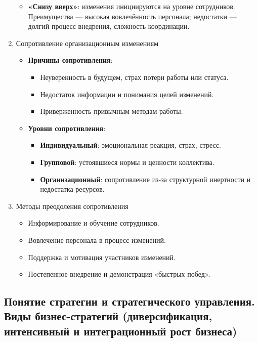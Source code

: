 \begin{enumerate}
\begin{itemize}
            \item \textbf{«Снизу вверх»}: изменения инициируются на уровне сотрудников. Преимущества --- высокая вовлечённость персонала; недостатки --- долгий процесс внедрения, сложность координации.
        \end{itemize}
    \item Сопротивление организационным изменениям
        \begin{itemize}
            \item \textbf{Причины сопротивления}:
            \begin{itemize}
                \item Неуверенность в будущем, страх потери работы или статуса.
                \item Недостаток информации и понимания целей изменений.
                \item Приверженность привычным методам работы.
            \end{itemize}
            \item \textbf{Уровни сопротивления}:
            \begin{itemize}
                \item \textbf{Индивидуальный}: эмоциональная реакция, страх, стресс.
                \item \textbf{Групповой}: устоявшиеся нормы и ценности коллектива.
                \item \textbf{Организационный}: сопротивление из-за структурной инертности и недостатка ресурсов.
            \end{itemize}
        \end{itemize}
    \item Методы преодоления сопротивления
        \begin{itemize}
            \item Информирование и обучение сотрудников.
            \item Вовлечение персонала в процесс изменений.
            \item Поддержка и мотивация участников изменений.
            \item Постепенное внедрение и демонстрация «быстрых побед».
        \end{itemize}
\end{enumerate}

\pagebreak
\subsection{Понятие стратегии и стратегического управления. Виды бизнес-стратегий (диверсификация, интенсивный и интеграционный рост бизнеса)}

